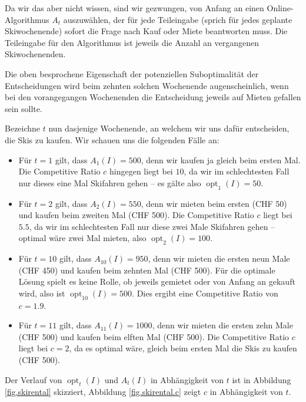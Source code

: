 \documentclass[11pt,abstracton]{scrreprt} %
\theoremstyle{definition}
\begin{document}
\bigskip
Da wir das aber nicht wissen, sind wir gezwungen, von Anfang an einen Online-Algorithmus $A_t$ auszuwählen, der für jede Teileingabe (sprich für jedes geplante Skiwochenende) sofort die Frage nach Kauf oder Miete beantworten muss. Die Teileingabe für den Algorithmus ist jeweils die Anzahl an vergangenen Skiwochenenden.

Die oben besprochene Eigenschaft der potenziellen Suboptimalität der Entscheidungen wird beim zehnten solchen Wochenende augenscheinlich, wenn bei den vorangegangen Wochenenden die Entscheidung jeweils auf Mieten gefallen sein sollte.

\bigskip
Bezeichne $t$ nun dasjenige Wochenende, an welchem wir uns dafür entscheiden, die Skis zu kaufen. Wir schauen uns die folgenden Fälle an:

\begin{itemize}
\item Für $t = 1$ gilt, dass $A_1(I) = 500$, denn wir kaufen ja gleich beim ersten Mal. Die Competitive Ratio $c$ hingegen liegt bei $10$, da wir im schlechtesten Fall nur dieses eine Mal Skifahren gehen -- es gälte also $\operatorname{opt}_1(I) = 50$.

\item Für $t = 2$ gilt, dass $A_2(I) = 550$, denn wir mieten beim ersten (CHF 50) und kaufen beim zweiten Mal (CHF 500). Die Competitive Ratio $c$ liegt bei $5.5$, da wir im schlechtesten Fall nur diese zwei Male Skifahren gehen -- optimal wäre zwei Mal mieten, also  $\operatorname{opt}_2(I) = 100$.

\item Für $t = 10$ gilt, dass $A_{10}(I) = 950$, denn wir mieten die ersten neun Male (CHF 450) und kaufen beim zehnten Mal (CHF 500). Für die optimale Lösung spielt es keine Rolle, ob jeweils gemietet oder von Anfang an gekauft wird, also ist $\operatorname{opt}_{10}(I) = 500$. Dies ergibt eine Competitive Ratio von $c = 1.9$.

\item Für $t = 11$ gilt, dass $A_{11}(I) = 1000$, denn wir mieten die ersten zehn Male (CHF 500) und kaufen beim elften Mal (CHF 500). Die Competitive Ratio $c$ liegt bei $c = 2$, da es optimal wäre, gleich beim ersten Mal die Skis zu kaufen (CHF 500).
\end{itemize}

Der Verlauf von $\operatorname{opt}_t(I)$ und $A_t(I)$ in Abhängigkeit von $t$ ist in Abbildung \ref{fig.skirental} skizziert, Abbildung \ref{fig.skirental.c} zeigt $c$ in Abhängigkeit von $t$.
\end{document}
